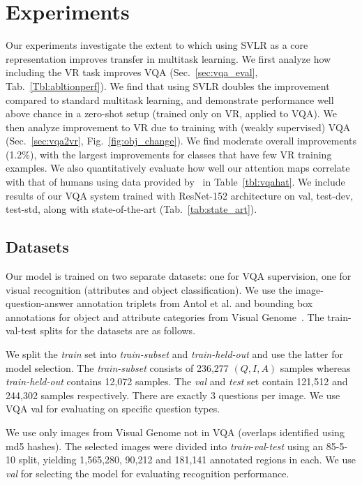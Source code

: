 \section{Experiments}
\label{sec:experiments}
Our experiments investigate the extent to which using SVLR as a core representation improves transfer in multitask learning.  We first analyze how including the VR task improves VQA (Sec.~\ref{sec:vqa_eval}, Tab.~\ref{Tbl:abltionperf}).  We find that using SVLR doubles the improvement compared to standard multitask learning, and demonstrate performance well above chance in a zero-shot setup (trained only on VR, applied to VQA).  We then analyze improvement to VR due to training with (weakly supervised) VQA (Sec.~\ref{sec:vqa2vr}, Fig.~\ref{fig:obj_change}).  We find moderate overall improvements (1.2$\%$), with the largest improvements for classes that have few VR training examples.  We also quantitatively evaluate how well our attention maps correlate with that of humans using data provided by~\cite{das2016human} in Table~\ref{tbl:vqahat}. We include results of our VQA system trained with ResNet-152 architecture on val, test-dev, test-std, along with state-of-the-art (Tab.~\ref{tab:state_art}). 



\subsection{Datasets}
Our model is trained on two separate datasets: one for VQA supervision, one for visual recognition (attributes and object classification). We use the image-question-answer annotation triplets from Antol et al. \cite{antol2015vqa} and bounding box annotations for object and attribute categories from Visual Genome~\cite{krishna2016visual}. The train-val-test splits for the datasets are as follows. 

 We split the \textit{train} set into \textit{train-subset} and \textit{train-held-out} and use the latter for model selection. The \textit{train-subset} consists of 236,277 $(Q,I,A)$ samples whereas \textit{train-held-out} contains 12,072 samples. The \textit{val} and \textit{test} set contain 121,512 and 244,302 samples respectively. There are exactly 3 questions per image. We use VQA val for evaluating on specific question types.

 We use only images from Visual Genome not in VQA (overlaps identified using md5 hashes). The selected images were divided into \textit{train}-\textit{val}-\textit{test} using an 85-5-10 split, yielding 1,565,280, 90,212 and 181,141 annotated regions in each. We use \textit{val} for selecting the model for evaluating recognition performance. 

